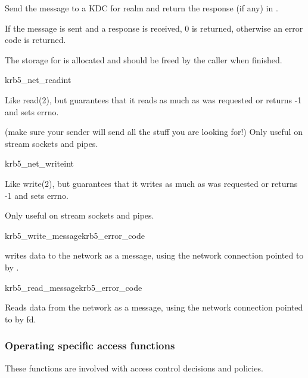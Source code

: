 Send the message  to a KDC for realm  and
return the response (if any) in .

If the message is sent and a response is received, 0 is returned,
otherwise an error code is returned.

The storage for  is allocated and should be freed by
the caller when finished.


\begin{funcdecl}{krb5_net_read}{int}{\funcin}
\funcout
{}
\funcin
{}
\end{funcdecl}

Like read(2), but guarantees that it reads as much as was requested
or returns -1 and sets errno.

(make sure your sender will send all the stuff you are looking for!)
Only useful on stream sockets and pipes.

\begin{funcdecl}{krb5_net_write}{int}{\funcin}
\end{funcdecl}

Like write(2), but guarantees that it writes as much as was requested
or returns -1 and sets errno.

Only useful on stream sockets and pipes.

\begin{funcdecl}{krb5_write_message}{krb5_error_code}{\funcin}
\end{funcdecl}


 writes data to the network as a message,
using the network connection pointed to by .

\begin{funcdecl}{krb5_read_message}{krb5_error_code}{\funcin}
\funcout
{}
\end{funcdecl}

Reads data from the network as a message, using the network connection
pointed to by fd.

\subsubsection{Operating specific access functions}
These functions are involved with access control decisions and policies.

